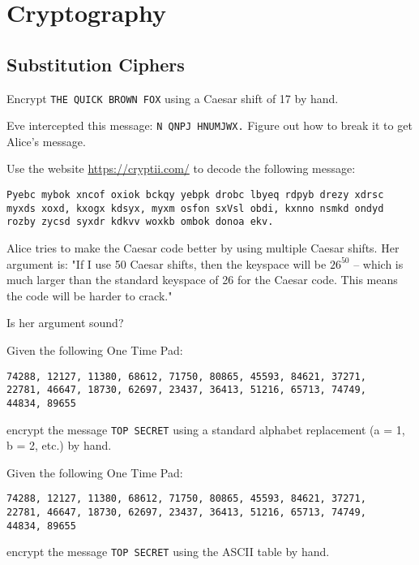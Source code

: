 \documentclass[11pt,a4paper]{report}
\begin{document}
\section{Cryptography}

\subsection{Substitution Ciphers}

\begin{ex}
Encrypt \verb|THE QUICK BROWN FOX| using a Caesar shift of 17 by hand.
\end{ex}


\begin{ex}
Eve intercepted this message: \verb|N QNPJ HNUMJWX.| Figure out how to break it to get Alice’s message.
\end{ex}


\begin{ex}
Use the website \url{https://cryptii.com/} to decode the following message:
\begin{verbatim}
Pyebc mybok xncof oxiok bckqy yebpk drobc lbyeq rdpyb drezy xdrsc
myxds xoxd, kxogx kdsyx, myxm osfon sxVsl obdi, kxnno nsmkd ondyd
rozby zycsd syxdr kdkvv woxkb ombok donoa ekv.
\end{verbatim}
\end{ex}

\begin{ex}
Alice tries to make the Caesar code better by using multiple Caesar shifts. Her argument is: "If I use 50 Caesar shifts,  then the keyspace will be $26^{50}$ -- which is much larger than the standard keyspace of 26 for the Caesar code.  This means the code will be harder to crack." 

Is her argument sound?
\end{ex}

\begin{ex}
Given the following One Time Pad: 
\begin{verbatim}
74288, 12127, 11380, 68612, 71750, 80865, 45593, 84621, 37271,
22781, 46647, 18730, 62697, 23437, 36413, 51216, 65713, 74749,
44834, 89655
\end{verbatim}
encrypt the message \verb|TOP SECRET| using a standard alphabet replacement (a = 1, b = 2, etc.) by hand.
\end{ex}

\begin{ex}
Given the following One Time Pad: 
\begin{verbatim}
74288, 12127, 11380, 68612, 71750, 80865, 45593, 84621, 37271,
22781, 46647, 18730, 62697, 23437, 36413, 51216, 65713, 74749,
44834, 89655
\end{verbatim}
encrypt the message \verb|TOP SECRET| using the ASCII table by hand.
\end{ex}
\end{document}
